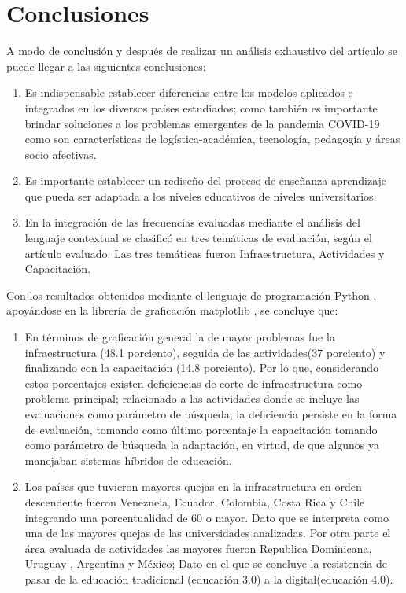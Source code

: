 \documentclass{article}
\begin{document}
\section{Conclusiones}
A modo de conclusión y después de realizar un análisis exhaustivo del artículo se puede llegar a las siguientes conclusiones:
\begin{enumerate}
    \item Es indispensable establecer diferencias entre los modelos aplicados e integrados en los diversos países estudiados; como también es importante brindar soluciones a los problemas emergentes de la pandemia COVID-19 como son características de logística-académica, tecnología, pedagogía y áreas socio afectivas.
    \item Es importante establecer un rediseño del proceso de enseñanza-aprendizaje que pueda ser adaptada a los niveles educativos de niveles universitarios.
    \item En la integración de las frecuencias evaluadas mediante el análisis del lenguaje contextual se clasificó en tres temáticas de evaluación, según el artículo evaluado. Las tres temáticas fueron Infraestructura, Actividades y Capacitación.
\end{enumerate}
Con los resultados obtenidos mediante el lenguaje de programación Python \citep{python}, apoyándose en la librería de graficación matplotlib \citep{matplot}, se concluye que:
\begin{enumerate}
    \item En términos de graficación general la de mayor problemas fue la infraestructura (48.1 porciento), seguida de las actividades(37 porciento) y finalizando con la capacitación (14.8 porciento). Por lo que, considerando estos porcentajes existen deficiencias de corte de infraestructura como problema principal; relacionado a las actividades donde se incluye las evaluaciones como parámetro de búsqueda, la deficiencia persiste en la forma de evaluación, tomando como último porcentaje la capacitación tomando como parámetro de búsqueda la adaptación, en virtud, de que algunos ya manejaban sistemas híbridos de educación.
    \item Los países que tuvieron mayores quejas en la infraestructura en orden descendente fueron Venezuela, Ecuador, Colombia, Costa Rica y Chile integrando una porcentualidad de 60 o mayor. Dato que se interpreta como una de las mayores quejas de las universidades analizadas. Por otra parte el área evaluada de actividades las mayores fueron Republica Dominicana, Uruguay , Argentina y México; Dato en el que se concluye la resistencia de pasar de la educación tradicional (educación 3.0) a la digital(educación 4.0).  
\end{enumerate}
\end{document}
